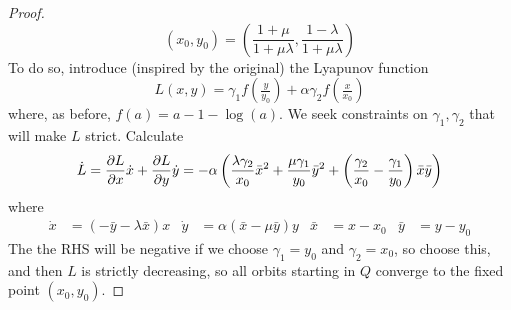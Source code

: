 \documentclass[../psets.tex]{subfiles}
\begin{document}
\begin{enumerate}
\begin{proof}
        \begin{equation*}
            (x_0,y_0) = \left( \frac{1+\mu}{1+\mu\lambda},\frac{1-\lambda}{1+\mu\lambda} \right)
        \end{equation*}
        To do so, introduce (inspired by the original) the Lyapunov function
        \begin{equation*}
            L(x,y) = \gamma_1f(\tfrac{y}{y_0})+\alpha\gamma_2f(\tfrac{x}{x_0})
        \end{equation*}
        where, as before, $f(a)=a-1-\log(a)$.
        We seek constraints on $\gamma_1,\gamma_2$ that will make $L$ strict.
        Calculate
        \begin{equation*}
            \dot{L} = \pdv{L}{x}\dot{x}+\pdv{L}{y}\dot{y}
            = -\alpha\left( \frac{\lambda\gamma_2}{x_0}\bar{x}^2+\frac{\mu\gamma_1}{y_0}\bar{y}^2+\left( \frac{\gamma_2}{x_0}-\frac{\gamma_1}{y_0} \right)\bar{x}\bar{y} \right)
        \end{equation*}
        where
        \begin{align*}
            \dot{x} &= (-\bar{y}-\lambda\bar{x})x&
            \dot{y} &= \alpha(\bar{x}-\mu\bar{y})y&
            \bar{x} &= x-x_0&
            \bar{y} &= y-y_0
        \end{align*}
        The the RHS will be negative if we choose $\gamma_1=y_0$ and $\gamma_2=x_0$, so choose this, and then $L$ is strictly decreasing, so all orbits starting in $Q$ converge to the fixed point $(x_0,y_0)$.
    \end{proof}
\end{enumerate}
\end{document}
